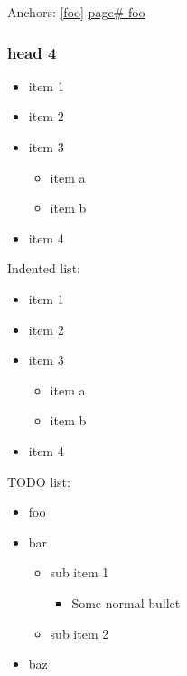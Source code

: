 Anchors: \label{foo}  \ref{foo}  \href{page#foo}{page\# foo}





\subsubsection{head 4 \label{head-4-anchor}}



\begin{itemize}
\item item 1
\item item 2
\item item 3
	\begin{itemize}
	\item item a
	\item item b
	\end{itemize}
\item item 4
\end{itemize}




Indented list:

	\begin{itemize}
	\item item 1
	\item item 2
	\item item 3
		\begin{itemize}
		\item item a
		\item item b
		\end{itemize}
	\item item 4
	\end{itemize}




TODO list:

\begin{itemize}
\item[\Square] foo
\item[\CheckedBox] bar
	\begin{itemize}
	\item[\CheckedBox] sub item 1
		\begin{itemize}
		\item Some normal bullet
		\end{itemize}
	\item[\CheckedBox] sub item 2
	\end{itemize}
\item[\XBox] baz
\end{itemize}



